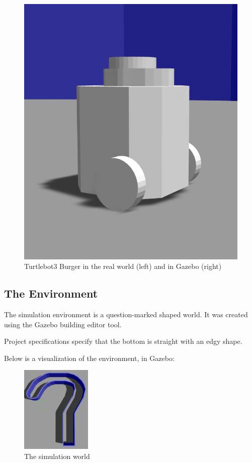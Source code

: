 \documentclass[conference]{IEEEtran}
\begin{document}
\begin{figure}[h]
\begin{minipage}{.4\columnwidth}
        \includegraphics[width=\textwidth]{images/turtlebot3-burger-gazebo.png}
    \end{minipage}
    \label{fig:robot-comparision}
    \caption{Turtlebot3 Burger in the real world (left) and in Gazebo (right)}
\end{figure}

\subsection{The Environment}

The simulation environment is a question-marked shaped world. It was created using the Gazebo building
editor tool.

Project specifications specify that the bottom is straight with an edgy shape.

Below is a visualization of the environment, in Gazebo:

\begin{figure}[h]
    \centering
    \includegraphics[width=0.3\textwidth]{images/world.png}
    \caption{The simulation world}
    \label{fig:environment}
\end{figure}
\end{document}
